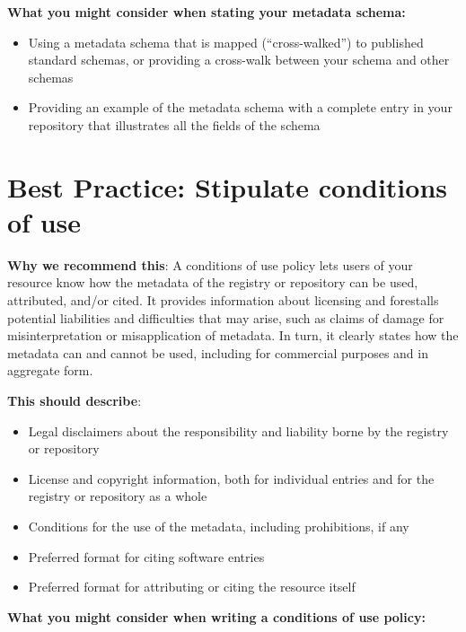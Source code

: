 \documentclass[11pt]{article}
\begin{document}
\textbf{What you might consider when stating your metadata schema:}

\begin{itemize}
\item Using a metadata schema that is mapped (``cross-walked'') to published standard schemas, or providing a cross-walk between your schema and other schemas

\item Providing an example of the metadata schema with a complete entry in your repository that illustrates all the fields of the schema

\end{itemize}


\section{Best Practice: Stipulate conditions of use}
\label{best-practice-stipulate-conditions-of-use}

\textbf{Why we recommend this}: A conditions of use policy lets users of your resource know how the metadata of the registry or repository can be used, attributed, and/or cited. It provides information about licensing and forestalls potential liabilities and difficulties that may arise, such as claims of damage for misinterpretation or misapplication of metadata. In turn, it clearly states how the metadata can and cannot be used, including for commercial purposes and in aggregate form.

\textbf{This should describe}:

\begin{itemize}
\item Legal disclaimers about the responsibility and liability borne by the registry or repository

\item License and copyright information, both for individual entries and for the registry or repository as a whole

\item Conditions for the use of the metadata, including prohibitions, if any

\item Preferred format for citing software entries

\item Preferred format for attributing or citing the resource itself

\end{itemize}

\textbf{What you might consider when writing a conditions of use policy:}
\end{document}
